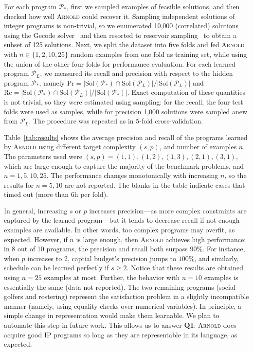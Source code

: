 \documentclass{article}
\newcommand{\learner}{\textsc{Arnold}\xspace}
\newcommand{\program}{\ensuremath{\mathcal{P}}\xspace}
\renewcommand\[{\begin{equation}}
\renewcommand\]{\end{equation}}
\begin{document}
For each program $\program_*$, first we sampled examples of feasible solutions,
and then checked how well \learner could recover it.
%
Sampling independent solutions of integer programs is non-trivial, so we
enumerated 10,000 (correlated) solutions using the Gecode
solver~\cite{schulte2006modeling} and then resorted to reservoir
sampling~\cite{tille2011sampling} to obtain a subset of 125 solutions.
%
Next, we split the dataset into five folds and fed \learner with $n \in \{1, 2,
10, 25\}$ random examples from one fold as training set, while using the union
of the other four folds for performance evaluation.
%
For each learned program $\program_L$, we measured its recall and precision
with respect to the hidden program $\program_*$, namely
%
$\text{Pr} = |\text{Sol}(\program_*) \cap \text{Sol}(\program_L)| / |\text{Sol}(\program_L)|$
and
$\text{Rc} = |\text{Sol}(\program_*) \cap \text{Sol}(\program_L)| / |\text{Sol}(\program_*)|$.
%
Exact computation of these quantities is not trivial,
so they were estimated
using sampling:  for the recall, the four test folds were used as samples,
while for precision 1,000 solutions were sampled anew from $\program_L$.
%
The procedure was repeated as in $5$-fold cross-validation.

Table~\ref{tab:results} shows the average
precision and recall of the programs learned by \learner using different target
complexity $(s, p)$, and number of examples $n$.  The parameters used were $(s,
p) = (1, 1), (1, 2), (1, 3), (2, 1), (3, 1)$, which are large enough to capture
the majority of the benchmark problems, and $n = 1, 5, 10, 25$.  The
performance changes monotonically with increasing $n$, so the results for $n =
5, 10$ are not reported.  The blanks in the table indicate cases that timed out
(more than $6$h per fold).

In general, increasing $s$ or $p$ increases precision---as more complex
constraints are captured by the learned program---but it tends to decrease
recall if not enough examples are available.  In other words, too complex
programs may overfit, as expected.
%
However, if $n$ is large enough, then \learner achieves high performance: in 8
out of 10 programs, the precision and recall both surpass $90\%$.  For
instance, when $p$ increases to $2$, captial budget's precision jumps to
$100\%$, and similarly, schedule can be learned perfectly if $s \ge 2$.  Notice
that these results are obtained using $n = 25$ examples at most.  Further, the
behavior with $n = 10$ examples is essentially the same (data not reported).
%
The two remaining programs (social golfers and rostering) represent the
satisfaction problem in a slightly incompatible manner (namely, using equality
checks over numerical variables).  In principle, a simple change in
representation would make them learnable.  We plan to automate this step in
future work.  This allows us to answer $\textbf{Q1}$: \learner does acquire
good IP programs so long as they are representable in its language, as expected.
\end{document}
